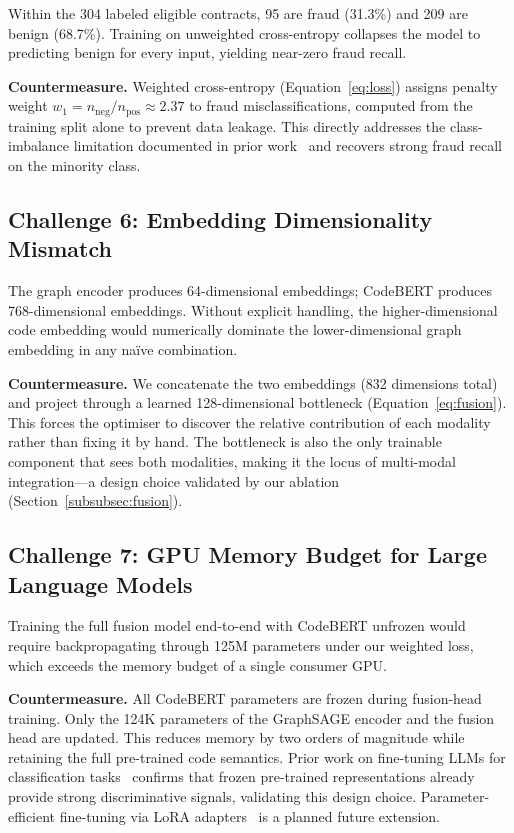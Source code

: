 Within the 304 labeled eligible contracts, 95 are fraud (31.3\%) and
209 are benign (68.7\%).  Training on unweighted cross-entropy collapses
the model to predicting benign for every input, yielding near-zero fraud
recall.

\textbf{Countermeasure.}
Weighted cross-entropy (Equation~\ref{eq:loss}) assigns penalty weight
$w_1 = n_\text{neg}/n_\text{pos} \approx 2.37$ to fraud
misclassifications, computed from the training split alone to prevent
data leakage.  This directly addresses the class-imbalance limitation
documented in prior work~\cite{chen2024dahgnn} and recovers strong
fraud recall on the minority class.

\subsection{Challenge 6: Embedding Dimensionality Mismatch}

The graph encoder produces 64-dimensional embeddings; CodeBERT produces
768-dimensional embeddings.  Without explicit handling, the higher-dimensional
code embedding would numerically dominate the lower-dimensional graph
embedding in any na\"ive combination.

\textbf{Countermeasure.}
We concatenate the two embeddings (832 dimensions total) and project
through a learned 128-dimensional bottleneck (Equation~\ref{eq:fusion}).
This forces the optimiser to discover the relative contribution of each
modality rather than fixing it by hand.  The bottleneck is also the only
trainable component that sees both modalities, making it the locus of
multi-modal integration---a design choice validated by our ablation
(Section~\ref{subsubsec:fusion}).

\subsection{Challenge 7: GPU Memory Budget for Large Language Models}

Training the full fusion model end-to-end with CodeBERT unfrozen would
require backpropagating through 125M parameters under our weighted loss,
which exceeds the memory budget of a single consumer GPU.

\textbf{Countermeasure.}
All CodeBERT parameters are frozen during fusion-head training.
Only the 124K parameters of the GraphSAGE encoder and the fusion
head are updated.  This reduces memory by two orders of magnitude while
retaining the full pre-trained code semantics.  Prior work on fine-tuning
LLMs for classification tasks~\cite{poudel2026fakenews} confirms that
frozen pre-trained representations already provide strong discriminative
signals, validating this design choice.  Parameter-efficient fine-tuning
via LoRA adapters~\cite{hu2022lora} is a planned future extension.
